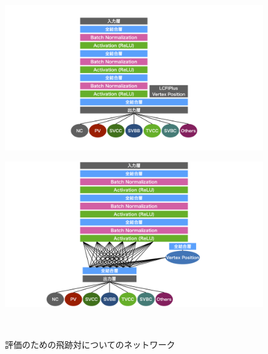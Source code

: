 \begin{figure}[htbp]
 \centering
  \begin{minipage}{1.0\textwidth}
  \centering
   \begin{minipage}{0.48\textwidth}
    \centering
    \includegraphics[trim = 200 0 200 0, width=1.0\textwidth, clip]{Figure/3Networks/3-3-3-1PairNetworkA.png}
    \label{3-3-3-1PairNetworkA}
   \end{minipage}
   \begin{minipage}{0.48\textwidth}
   \centering
    \includegraphics[trim = 200 0 200 0, width=1.0\textwidth, clip]{Figure/3Networks/3-3-3-1PairNetworkB.png}
    \label{3-3-3-1PairNetworkB}
   \end{minipage}
  \end{minipage}  
  \caption{評価のための飛跡対についてのネットワーク}
  \label{3-3-3-1PairNetworks}
\end{figure}

